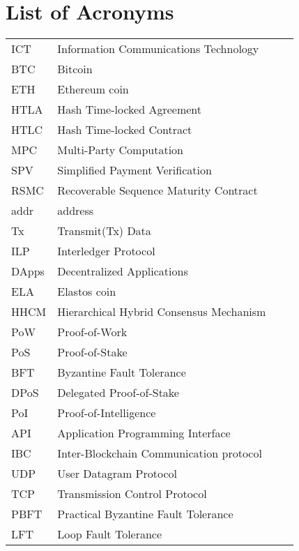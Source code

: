 \chapter{List of Acronyms}

\begin{table}[h]
\begin{tabular}{p{2.7cm}lp{8cm}l}

ICT               & Information Communications Technology \\
BTC              & Bitcoin \\ 	
ETH              & Ethereum coin\\
HTLA             & Hash Time-locked Agreement \\
HTLC             & Hash Time-locked Contract \\ 	
MPC              & Multi-Party Computation \\
SPV              & Simplified Payment Verification \\ 	
RSMC             & Recoverable Sequence Maturity Contract \\
addr             & address\\
Tx               & Transmit(Tx) Data \\
ILP              & Interledger Protocol \\ 	
DApps            & Decentralized Applications \\
ELA              & Elastos coin\\	
HHCM             & Hierarchical Hybrid Consensus Mechanism\\
PoW              & Proof-of-Work\\
PoS              & Proof-of-Stake\\
BFT              & Byzantine Fault Tolerance\\
DPoS             & Delegated Proof-of-Stake\\
PoI              & Proof-of-Intelligence\\
API              & Application Programming Interface\\
IBC              & Inter-Blockchain Communication protocol\\
UDP              & User Datagram Protocol\\
TCP              & Transmission Control Protocol\\
PBFT             & Practical Byzantine Fault Tolerance\\
LFT              & Loop Fault Tolerance\\
\end{tabular}
\end{table}